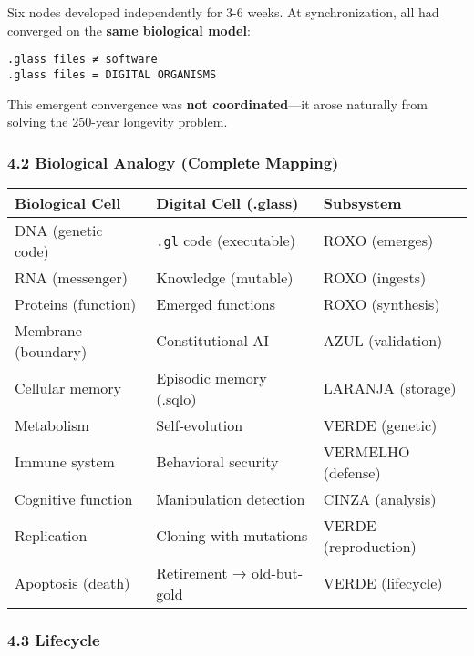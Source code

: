 \documentclass[
]{article}
\begin{document}
Six nodes developed independently for 3-6 weeks. At synchronization, all
had converged on the \textbf{same biological model}:

\begin{verbatim}
.glass files ≠ software
.glass files = DIGITAL ORGANISMS
\end{verbatim}

This emergent convergence was \textbf{not coordinated}---it arose
naturally from solving the 250-year longevity problem.

\subsubsection{4.2 Biological Analogy (Complete
Mapping)}\label{biological-analogy-complete-mapping}

{\def\LTcaptype{} %
\begin{longtable}[]{@{}lll@{}}
\toprule\noalign{}
Biological Cell & Digital Cell (.glass) & Subsystem \\
\midrule\noalign{}
\endhead
\bottomrule\noalign{}
\endlastfoot
DNA (genetic code) & \texttt{.gl} code (executable) & ROXO (emerges) \\
RNA (messenger) & Knowledge (mutable) & ROXO (ingests) \\
Proteins (function) & Emerged functions & ROXO (synthesis) \\
Membrane (boundary) & Constitutional AI & AZUL (validation) \\
Cellular memory & Episodic memory (.sqlo) & LARANJA (storage) \\
Metabolism & Self-evolution & VERDE (genetic) \\
Immune system & Behavioral security & VERMELHO (defense) \\
Cognitive function & Manipulation detection & CINZA (analysis) \\
Replication & Cloning with mutations & VERDE (reproduction) \\
Apoptosis (death) & Retirement → old-but-gold & VERDE (lifecycle) \\
\end{longtable}
}

\subsubsection{4.3 Lifecycle}\label{lifecycle}
\end{document}
